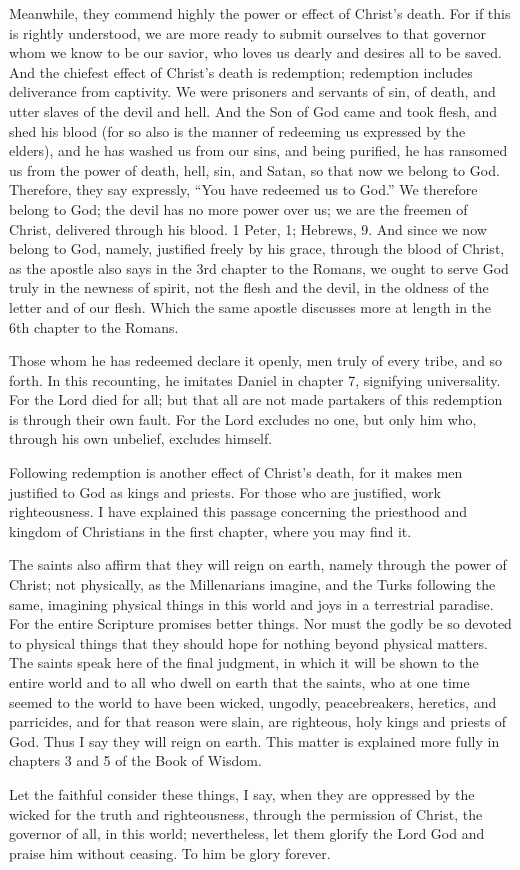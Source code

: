 Meanwhile, they commend highly the power or effect of Christ’s death. For if this is rightly understood, we are more ready to submit ourselves to that governor whom we know to be our savior, who loves us dearly and desires all to be saved. And the chiefest effect of Christ’s death is redemption; redemption includes deliverance from captivity. We were prisoners and servants of sin, of death, and utter slaves of the devil and hell. And the Son of God came and took flesh, and shed his blood (for so also is the manner of redeeming us expressed by the elders), and he has washed us from our sins, and being purified, he has ransomed us from the power of death, hell, sin, and Satan, so that now we belong to God. Therefore, they say expressly, “You have redeemed us to God.” We therefore belong to God; the devil has no more power over us; we are the freemen of Christ, delivered through his blood. 1 Peter, 1; Hebrews, 9. And since we now belong to God, namely, justified freely by his grace, through the blood of Christ, as the apostle also says in the 3rd chapter to the Romans, we ought to serve God truly in the newness of spirit, not the flesh and the devil, in the oldness of the letter and of our flesh. Which the same apostle discusses more at length in the 6th chapter to the Romans.

Those whom he has redeemed declare it openly, men truly of every tribe, and so forth. In this recounting, he imitates Daniel in chapter 7, signifying universality. For the Lord died for all; but that all are not made partakers of this redemption is through their own fault. For the Lord excludes no one, but only him who, through his own unbelief, excludes himself.

Following redemption is another effect of Christ's death, for it makes men justified to God as kings and priests. For those who are justified, work righteousness. I have explained this passage concerning the priesthood and kingdom of Christians in the first chapter, where you may find it.

The saints also affirm that they will reign on earth, namely through the power of Christ; not physically, as the Millenarians imagine, and the Turks following the same, imagining physical things in this world and joys in a terrestrial paradise. For the entire Scripture promises better things. Nor must the godly be so devoted to physical things that they should hope for nothing beyond physical matters. The saints speak here of the final judgment, in which it will be shown to the entire world and to all who dwell on earth that the saints, who at one time seemed to the world to have been wicked, ungodly, peacebreakers, heretics, and parricides, and for that reason were slain, are righteous, holy kings and priests of God. Thus I say they will reign on earth. This matter is explained more fully in chapters 3 and 5 of the Book of Wisdom.

Let the faithful consider these things, I say, when they are oppressed by the wicked for the truth and righteousness, through the permission of Christ, the governor of all, in this world; nevertheless, let them glorify the Lord God and praise him without ceasing. To him be glory forever.
